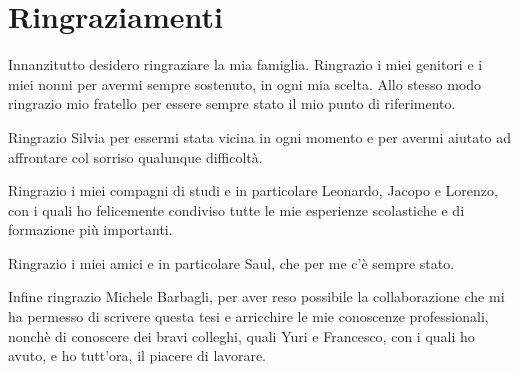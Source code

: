 \chapter*{Ringraziamenti}

Innanzitutto desidero ringraziare la mia famiglia. Ringrazio i miei genitori e i miei nonni per avermi sempre sostenuto, in ogni mia scelta. Allo stesso modo ringrazio mio fratello per essere sempre stato il mio punto di riferimento.\par
Ringrazio Silvia per essermi stata vicina in ogni momento e per avermi aiutato ad affrontare col sorriso qualunque difficolt\`a.\par
Ringrazio i miei compagni di studi e in particolare Leonardo, Jacopo e Lorenzo, con i quali ho felicemente condiviso tutte le mie esperienze scolastiche e di formazione pi\`u importanti.\par
Ringrazio i miei amici e in particolare Saul, che per me c'\`e sempre stato.\par
Infine ringrazio Michele Barbagli, per aver reso possibile la collaborazione che mi ha permesso di scrivere questa tesi e arricchire le mie conoscenze professionali, nonch\`e di conoscere dei bravi colleghi, quali Yuri e Francesco, con i quali ho avuto, e ho tutt'ora, il piacere di lavorare.

